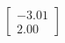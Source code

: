 \documentclass[preview]{standalone}
\begin{document}
\begin{align*}
\begin{bmatrix} -3.01 \\ 2.00 \end{bmatrix}
\end{align*}
\end{document}
